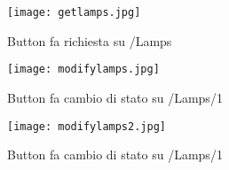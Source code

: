 \begin{figure}[H]
    \centering
    \texttt{[image: getlamps.jpg]}
    \caption{Button fa richiesta su /Lamps}
\end{figure}


\begin{figure}[H]
    \centering
    \texttt{[image: modifylamps.jpg]}
    \caption{Button fa cambio di stato su /Lamps/1}
\end{figure}

\begin{figure}[H]
    \centering
    \texttt{[image: modifylamps2.jpg]}
    \caption{Button fa cambio di stato su /Lamps/1}
\end{figure}